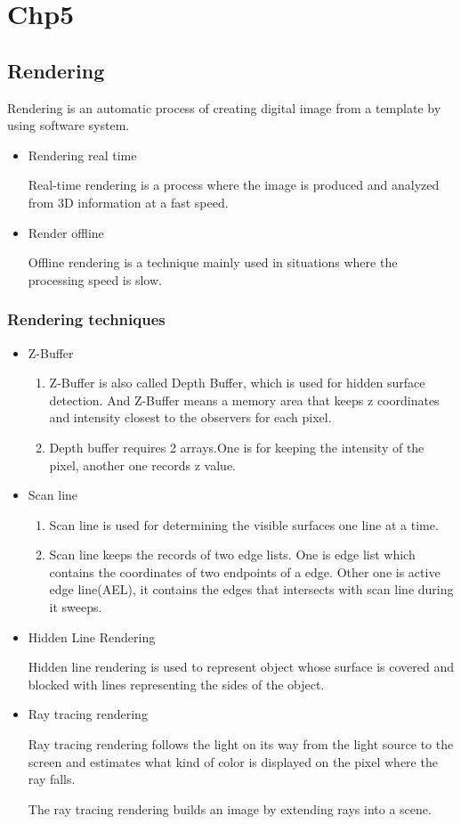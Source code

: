 \documentclass[UTF8]{ctexart}
\begin{document}
\section{Chp5}
\subsection{Rendering}
Rendering is an automatic process of creating digital image from a template by using software system.

\begin{itemize}
    \item Rendering real time
    
    Real-time rendering is a process where the image is produced and analyzed from 3D information at a fast speed.
    \item Render offline
    
    Offline rendering is a technique mainly used in situations where the processing speed is slow.
\end{itemize}

\subsubsection{Rendering techniques}
\begin{itemize}
    \item Z-Buffer
    \begin{enumerate}
        \item Z-Buffer is also called Depth Buffer, which is used for hidden surface detection. And Z-Buffer means a memory area that keeps z coordinates and intensity closest to the observers for each pixel.
        \item Depth buffer requires 2 arrays.One is for keeping the intensity of the pixel, another one records z value. 
    \end{enumerate}
    \item Scan line
    \begin{enumerate}
        \item Scan line is used for determining the visible surfaces one line at a time.
        \item Scan line keeps the records of two edge lists. One is edge list which contains the coordinates of two endpoints of a edge. Other one is active edge line(AEL), it contains the edges that intersects with scan line during it sweeps.
    \end{enumerate}
    \item Hidden Line Rendering
    
    Hidden line rendering is used to represent object whose surface is covered and blocked with lines representing the sides of the object.

    \item Ray tracing rendering
    
    Ray tracing rendering follows the light on its way from the light source to the screen and estimates what kind of color is displayed on the pixel where the ray falls.

    The ray tracing rendering builds an image by extending rays into a scene.
    
\end{itemize}
\end{document}
